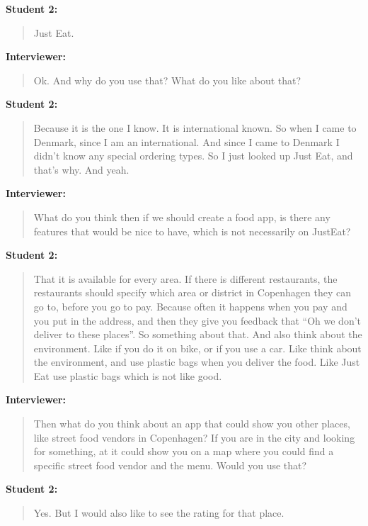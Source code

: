 \textbf{Student 2:}
\begin{quotation}
    Just Eat.
\end{quotation}

\textbf{Interviewer:}
\begin{quotation}
    Ok. And why do you use that? What do you like about that?
\end{quotation}

\textbf{Student 2:}
\begin{quotation}
    Because it is the one I know. It is international known. So when I came to Denmark, since I am an international. And since I came to Denmark I didn’t know any special ordering types. So I just looked up Just Eat, and that’s why. And yeah.
\end{quotation}

\textbf{Interviewer:}
\begin{quotation}
    What do you think then if we should create a food app, is there any features that would be nice to have, which is not necessarily on JustEat?
\end{quotation}

\textbf{Student 2:}
\begin{quotation}
    That it is available for every area. If there is different restaurants, the restaurants should specify which area or district in Copenhagen they can go to, before you go to pay. Because often it happens when you pay and you put in the address, and then they give you feedback that “Oh we don’t deliver to these places”. So something about that. And also think about the environment. Like if you do it on bike, or if you use a car. Like think about the environment, and use plastic bags when you deliver the food. Like Just Eat use plastic bags which is not like good.
\end{quotation}

\textbf{Interviewer:}
\begin{quotation}
    Then what do you think about an app that could show you other places, like street food vendors in Copenhagen? If you are in the city and looking for something, at it could show you on a map where you could find a specific street food vendor and the menu. Would you use that?
\end{quotation}

\textbf{Student 2:}
\begin{quotation}
    Yes. But I would also like to see the rating for that place.
\end{quotation}

